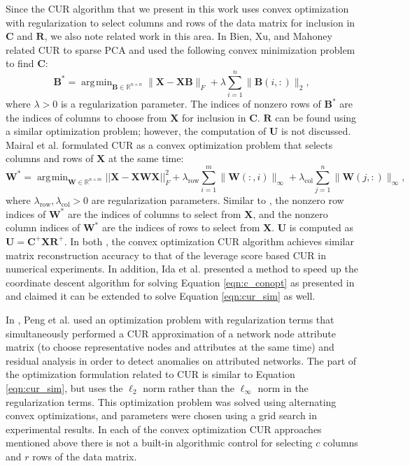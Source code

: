 \documentclass[12pt]{article}
\DeclareMathOperator*{\argmin}{\arg\!\min}
\begin{document}
Since the CUR algorithm that we present in this work uses convex optimization with regularization to select columns and rows of the data matrix for inclusion in $\mathbf{C}$ and $\mathbf{R}$, we also note related work in this area. In \cite{bien_xu_mahoney_2010} Bien, Xu, and Mahoney related CUR to sparse PCA and used the following convex minimization problem to find $\mathbf{C}$:
\begin{equation}
\label{eqn:c_conopt}
\mathbf{B}^* = \argmin_{\mathbf{B} \in \mathbb{R}^{n \times n}} \|\mathbf{X} - \mathbf{XB}\|_F + \lambda \sum_{i=1}^n \| \mathbf{B}(i,:) \|_2,
\end{equation}
where $\lambda>0$ is a regularization parameter. The indices of nonzero rows of $\mathbf{B}^*$ are the indices of columns to choose from $\mathbf{X}$ for inclusion in $\mathbf{C}$. $\mathbf{R}$ can be found using a similar optimization problem; however, the computation of $\mathbf{U}$ is not discussed. Mairal et al. \cite{mairal_etal_2011} formulated CUR as a convex optimization problem that selects columns and rows of $\mathbf{X}$ at the same time:
\begin{equation}
\label{eqn:cur_sim}    
\mathbf{W^*} = \argmin_{\mathbf{W} \in \mathbb{R}^{n \times m}} ||\mathbf{X-XWX}||_F^2 + \lambda_{\text{row}} \sum_{i=1}^m \| \mathbf{W}(:,i) \|_{\infty} + \lambda_{\text{col}} \sum_{j=1}^n \| \mathbf{W}(j,:) \|_{\infty},
\end{equation}
where $\lambda_{\text{row}}, \lambda_{\text{col}}>0$ are regularization parameters.  Similar to \cite{bien_xu_mahoney_2010}, the nonzero row indices of $\mathbf{W}^*$ are the indices of columns to select from $\mathbf{X}$, and the nonzero column indices of $\mathbf{W}^*$ are the indices of rows to select from $\mathbf{X}$. $\mathbf{U}$ is computed as $\mathbf{U = C^+XR^+}$.  In both \cite{bien_xu_mahoney_2010, mairal_etal_2011}, the convex optimization CUR algorithm achieves similar matrix reconstruction accuracy to that of the leverage score based CUR \cite{mahoney_drineas_2009} in numerical experiments.  In addition, Ida et al. \cite{ida_etal_2020} presented a method to speed up the coordinate descent algorithm for solving Equation \ref{eqn:c_conopt} as presented in \cite{bien_xu_mahoney_2010} and claimed it can be extended to solve Equation \ref{eqn:cur_sim} as well.  

In \cite{peng_etal_2018}, Peng et al. used an optimization problem with regularization terms that simultaneously performed a CUR approximation of a network node attribute matrix (to choose representative nodes and attributes at the same time) and residual analysis in order to detect anomalies on attributed networks.  The part of the optimization formulation related to CUR is similar to Equation \ref{eqn:cur_sim}, but uses the $\ell_2$ norm rather than the $\ell_{\infty}$ norm in the regularization terms.  This optimization problem was solved using alternating convex optimizations, and parameters were chosen using a grid search in experimental results.  In each of the convex optimization CUR approaches mentioned above \cite{bien_xu_mahoney_2010, mairal_etal_2011, ida_etal_2020, peng_etal_2018} there is not a built-in algorithmic control for selecting $c$ columns and $r$ rows of the data matrix. 
\end{document}
